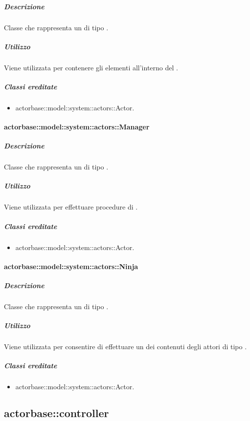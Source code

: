 \documentclass{scalatekids-article}
\begin{document}
\subparagraph{Descrizione}

Classe che rappresenta un  di tipo .

\subparagraph{Utilizzo}

Viene utilizzata per contenere gli elementi all'interno del .

\subparagraph{Classi ereditate}

\begin{itemize}
\item actorbase::model::system::actors::Actor.
\end{itemize}

\paragraph{actorbase::model::system::actors::Manager}

\subparagraph{Descrizione}

Classe che rappresenta un  di tipo .

\subparagraph{Utilizzo}

Viene utilizzata per effettuare procedure di .

\subparagraph{Classi ereditate}

\begin{itemize}
\item actorbase::model::system::actors::Actor.
\end{itemize}

\paragraph{actorbase::model::system::actors::Ninja}

\subparagraph{Descrizione}

Classe che rappresenta un  di tipo .

\subparagraph{Utilizzo}

Viene utilizzata per consentire di effettuare un  dei contenuti
degli attori di tipo .

\subparagraph{Classi ereditate}

\begin{itemize}
\item actorbase::model::system::actors::Actor.
\end{itemize}

\subsection{actorbase::controller}
\end{document}

